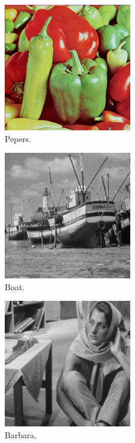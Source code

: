 \begin{frame}[allowframebreaks]
  \begin{figure}[h!]
  \centering
  \includegraphics[width=0.5\textwidth]{images/peppers.jpg}
  \caption{Pepers.}
  \label{fig:pepers}
  \end{figure}

  \framebreak

  \begin{figure}[h!]
  \centering
  \includegraphics[width=0.5\textwidth]{images/boat.jpg}
  \caption{Boat.}
  \label{fig:boat}
  \end{figure}

  \framebreak

  \begin{figure}[h!]
  \centering
  \includegraphics[width=0.5\textwidth]{images/barbara.jpg}
  \caption{Barbara.}
  \label{fig:barbara}
  \end{figure}

\end{frame}


